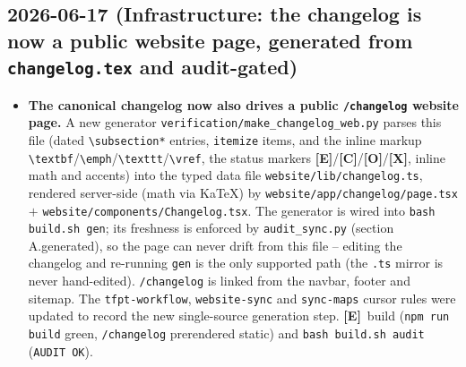 \documentclass[11pt]{article}
\providecommand{\mE}{\textbf{[E]}}\providecommand{\mC}{\textbf{[C]}}
\providecommand{\mO}{\textbf{[O]}}\providecommand{\mX}{\textbf{[X]}}
\begin{document}
\subsection*{2026-06-17 (Infrastructure: the changelog is now a public website page, generated from \texttt{changelog.tex} and audit-gated)}
\begin{itemize}
\item \textbf{The canonical changelog now also drives a public \texttt{/changelog} website page.}
  A new generator \texttt{verification/make\_changelog\_web.py} parses this file (dated
  \texttt{\textbackslash subsection*} entries, \texttt{itemize} items, and the inline markup
  \texttt{\textbackslash textbf}/\texttt{\textbackslash emph}/\texttt{\textbackslash texttt}/\texttt{\textbackslash vref},
  the status markers \mE/\mC/\mO/\mX, inline math and accents) into the typed data file
  \texttt{website/\allowbreak lib/\allowbreak changelog.ts}, rendered server-side (math via KaTeX) by
  \texttt{website/\allowbreak app/\allowbreak changelog/\allowbreak page.tsx} $+$ \texttt{website/\allowbreak components/\allowbreak Changelog.tsx}. The
  generator is wired into \texttt{bash build.sh gen}; its freshness is enforced by
  \texttt{audit\_sync.py} (section A.generated), so the page can never drift from this file --
  editing the changelog and re-running \texttt{gen} is the only supported path (the \texttt{.ts}
  mirror is never hand-edited). \texttt{/changelog} is linked from the navbar, footer and sitemap.
  The \texttt{tfpt-workflow}, \texttt{website-sync} and \texttt{sync-maps} cursor rules were updated
  to record the new single-source generation step. \mE\ build (\texttt{npm run build} green,
  \texttt{/changelog} prerendered static) and \texttt{bash build.sh audit} (\texttt{AUDIT OK}).
\end{itemize}
\end{document}
